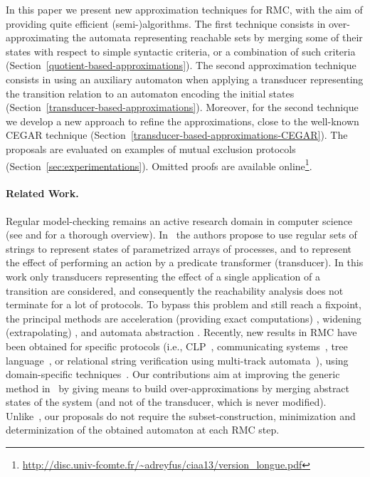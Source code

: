 \documentclass[]{llncs}
\begin{document}
In this paper we present new approximation techniques for RMC,  with the aim of 
providing quite efficient (semi-)algorithms.  The first technique consists in over-approximating the automata
  representing reachable sets by merging some of their states with respect to simple syntactic criteria, or a combination of such criteria (Section~\ref{quotient-based-approximations}).  
The second approximation technique consists in using  an auxiliary automaton when applying a transducer
  representing the transition relation to an automaton encoding the initial states (Section~\ref{transducer-based-approximations}). Moreover, for the second technique we develop  a new approach to refine the approximations, close to 
the well-known CEGAR technique (Section~\ref{transducer-based-approximations-CEGAR}).  The proposals are evaluated on examples of mutual
  exclusion protocols (Section~\ref{sec:experimentations}).
Omitted proofs are available online\footnote{\url{http://disc.univ-fcomte.fr/~adreyfus/ciaa13/version_longue.pdf}}.


\paragraph*{Related Work.}\label{sec:relatedwork}
Regular model-checking remains an active research domain in
computer science (see \cite{clarke_model_2000} and
\cite{baier_principles_2008} for a thorough overview).
In~\cite{kesten_symbolic_1997} the authors propose to use regular sets of
strings to represent states of parametrized arrays of processes, and to
represent the effect of performing an action by a predicate transformer
(transducer). In this work only transducers representing the effect of a
single application of a transition are considered, and consequently the
reachability analysis does not terminate for a lot of protocols. To bypass
this problem and still reach a fixpoint, the principal methods are
acceleration (providing exact computations)
\cite{jonsson_transitive_2000,bouajjani_regular_2000,dams_iterating_2001,dams_iterating_2002,abdulla_algorithmic_2003,boigelot_iterating_2003},
widening (extrapolating)
\cite{bouajjani_regular_2000,touili_regular_2001,legay_extrapolating_2012},
and automata abstraction \cite{bouajjani_abstract_2004}. Recently, new
results in RMC have been obtained for specific protocols (i.e.,
CLP~\cite{fioravanti_program_2011}, communicating
systems~\cite{Abstract_interpretation_of_FIFO_channels}, tree
language~\cite{abdulla_regular_tree_2002,bouajjani_widening_2011}, or
relational string verification using multi-track
automata~\cite{yu_relational_2011}), using domain-specific
techniques~\cite{boigelot_domain-specific_2012}. Our contributions aim at 
improving the generic method in~\cite{bouajjani_abstract_2004} by giving means
to build over-approximations by merging abstract states of the system
(and not of the transducer, which is never modified).
Unlike~\cite{bouajjani_regular_2000,bouajjani_abstract_2004}, our proposals 
do not require the subset-construction, minimization and 
determinization of the obtained automaton at each RMC step. 
\end{document}
